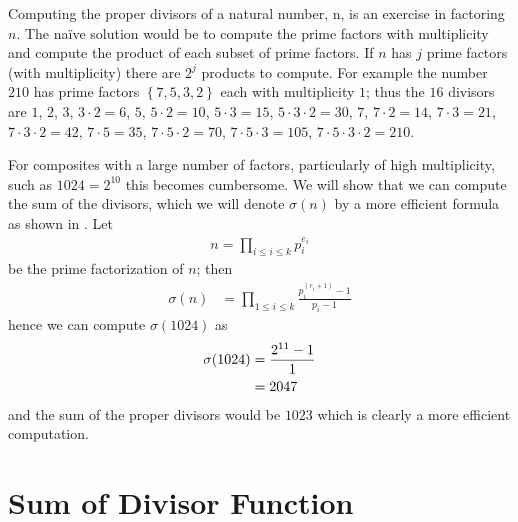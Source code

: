 \documentclass[oneside,12pt]{book}   	%
\newcounter{ex}
\newcounter{pr}
\theoremstyle{definition}
\newcommand{\set}[1]{\left\{#1\right\}}
\begin{document}
\begin{spacing}{1.618}
	 	Computing the proper divisors of a natural number, n, is an exercise in factoring $n$. The na\"ive solution would be to compute the prime factors with multiplicity and compute the product of each subset of prime factors. If $n$ has $j$ prime factors (with multiplicity) there are $2^j$ products to compute. For example the number $210$ has prime factors $\set{7, 5, 3, 2}$ each with multiplicity $1$; thus the $16$ divisors are $1$, $2$, $3$, $3\cdot 2=6$, $5$, $5\cdot 2=10$, $5\cdot 3=15$, $5\cdot 3\cdot 2=30$, $7$, $7\cdot 2=14$, $7\cdot 3=21$, $7\cdot 3\cdot 2=42$, $7\cdot 5=35$, $7\cdot 5\cdot 2=70$, $7\cdot 5\cdot 3=105$, $7\cdot 5\cdot 3\cdot 2=210$. 
		
		For composites with a large number of factors, particularly of high multiplicity, such as $1024=2^10$ this becomes cumbersome. We will show that we can compute the sum of the divisors, which we will denote $\sigma(n)$ by a more efficient formula as shown in \cite{BS1996}. Let
		\begin{alignat}{4}
			n=\prod_{i\leq i\leq k}p_i^{e_i}
		\end{alignat}
		be the prime factorization of $n$; then 
		\begin{alignat}{4}
			\sigma(n)&=\prod_{1\leq i\leq k}\frac{p_i^{(e_i+1)}-1}{p_i-1}
		\end{alignat}
		hence we can compute $\sigma(1024)$ as 
		\begin{alignat}{4}
			\sigma(1024)&=\frac{2^{11}-1}{1} \notag \\
				&=2047
		\end{alignat}
		and the sum of the proper divisors would be $1023$ which is clearly a more efficient computation. 
		
	\section{Sum of Divisor Function}
	

\end{spacing}
\end{document}
